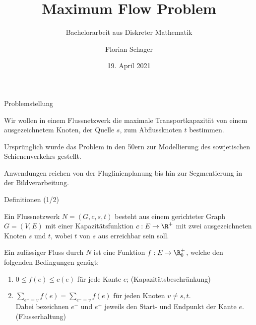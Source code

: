 \documentclass[aspectratio=169]{beamer}
\title[Maximum Flow Problem]{Maximum Flow Problem}
\subtitle{Bachelorarbeit aus Diskreter Mathematik}
\author[F. Schager]{Florian Schager}
\institute[TU Wien]{TU Wien, Vienna, Austria}
\date{19. April 2021}
\begin{document}
\begin{frame}
    \titlepage
\end{frame}


\begin{frame}{Problemstellung}
  \begin{problem*}
    Wir wollen in einem Flussnetzwerk die maximale Transportkapazität
    von einem ausgezeichnetem Knoten, der Quelle $s$, zum Abflussknoten $t$ bestimmen.

    Ursprünglich wurde das Problem in den 50ern zur Modellierung des sowjetischen Schienenverkehrs gestellt.

    Anwendungen reichen von der Fluglinienplanung bis hin zur Segmentierung in der
    Bildverarbeitung.
  \end{problem*}
\end{frame}


\begin{frame}{Definitionen (1/2)}
  \begin{definition*}[Flussnetzwerk]
    Ein Flussnetzwerk $N = (G,c,s,t)$ besteht aus einem gerichteter Graph $G = (V,E)$ mit einer
    Kapazitätsfunktion $c: E \to \R^+$ mit zwei ausgezeichneten Knoten $s$ und $t$,
    wobei $t$ von $s$ aus erreichbar sein soll.
  \end{definition*}

  \pause

  \begin{definition*}[Fluss]
    Ein zulässiger Fluss durch $N$ ist eine Funktion $f: E \to \R_0^+$, welche
    den folgenden Bedingungen genügt:
    \begin{enumerate}
      \item<3-> $0 \leq f(e) \leq c(e)$ für jede Kante $e$; \quad (Kapazitätsbeschränkung)
      \item<4> $\sum_{e^+ = v} f(e) = \sum_{e^- = v} f(e)$ für jeden Knoten $v \neq s,t$. \\
      Dabei bezeichnen $e^-$ und $e^+$ jeweils den Start- und Endpunkt der Kante $e$.
      \quad (Flusserhaltung)
    \end{enumerate}
  \end{definition*}
\end{frame}
\end{document}

